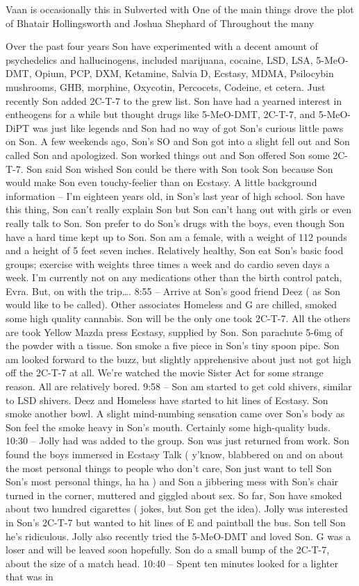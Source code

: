 \documentclass[12pt]{book}
\begin{document}
Vaan is occasionally this in Subverted with One of the main things drove the plot of Bhatair Hollingsworth and Joshua Shephard of Throughout the many



Over the past four years Son have experimented with a decent amount of psychedelics and hallucinogens, included marijuana, cocaine, LSD, LSA, 5-MeO-DMT, Opium, PCP, DXM, Ketamine, Salvia D, Ecstasy, MDMA, Psilocybin mushrooms, GHB, morphine, Oxycotin, Percocets, Codeine, et cetera. Just recently Son added 2C-T-7 to the grew list. Son have had a yearned interest in entheogens for a while but thought drugs like 5-MeO-DMT, 2C-T-7, and 5-MeO-DiPT was just like legends and Son had no way of got Son's curious little paws on Son. A few weekends ago, Son's SO and Son got into a slight fell out and Son called Son and apologized. Son worked things out and Son offered Son some 2C-T-7. Son said Son wished Son could be there with Son took Son because Son would make Son even touchy-feelier than on Ecstasy. A little background information -- I'm eighteen years old, in Son's last year of high school. Son have this thing, Son can't really explain Son but Son can't hang out with girls or even really talk to Son. Son prefer to do Son's drugs with the boys, even though Son have a hard time kept up to Son. Son am a female, with a weight of 112 pounds and a height of 5 feet seven inches. Relatively healthy, Son eat Son's basic food groups; exercise with weights three times a week and do cardio seven days a week. I'm currently not on any medications other than the birth control patch, Evra. But, on with the trip\ldots. 8:55 -- Arrive at Son's good friend Deez ( as Son would like to be called). Other associates Homeless and G are chilled, smoked some high quality cannabis. Son will be the only one took 2C-T-7. All the others are took Yellow Mazda press Ecstasy, supplied by Son. Son parachute 5-6mg of the powder with a tissue. Son smoke a five piece in Son's tiny spoon pipe. Son am looked forward to the buzz, but slightly apprehensive about just not got high off the 2C-T-7 at all. We're watched the movie Sister Act for some strange reason. All are relatively bored. 9:58 -- Son am started to get cold shivers, similar to LSD shivers. Deez and Homeless have started to hit lines of Ecstasy. Son smoke another bowl. A slight mind-numbing sensation came over Son's body as Son feel the smoke heavy in Son's mouth. Certainly some high-quality buds. 10:30 -- Jolly had was added to the group. Son was just returned from work. Son found the boys immersed in Ecstasy Talk ( y'know, blabbered on and on about the most personal things to people who don't care, Son just want to tell Son Son's most personal things, ha ha ) and Son a jibbering mess with Son's chair turned in the corner, muttered and giggled about sex. So far, Son have smoked about two hundred cigarettes ( jokes, but Son get the idea). Jolly was interested in Son's 2C-T-7 but wanted to hit lines of E and paintball the bus. Son tell Son he's ridiculous. Jolly also recently tried the 5-MeO-DMT and loved Son. G was a loser and will be leaved soon hopefully. Son do a small bump of the 2C-T-7, about the size of a match head. 10:40 -- Spent ten minutes looked for a lighter that was in 
\end{document}

